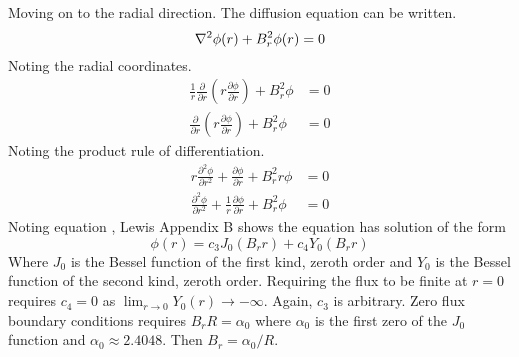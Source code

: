   Moving on to the radial direction. The diffusion equation can be written.
  \begin{equation}
    \mathbf{\nabla}^2 \phi(r) + B_r^2 \phi(r) = 0
  \end{equation}
  Noting the radial coordinates.
  \begin{align}
    \frac{1}{r} \frac{\partial}{\partial r} \left( r \frac{\partial \phi}
      {\partial r} \right) + B_r^2 \phi &= 0 \\
    \frac{\partial}{\partial r} \left( r \frac{\partial \phi}{\partial r}
      \right) + B_r^2 \phi &= 0
  \end{align}
  Noting the product rule of differentiation.
  \begin{align}
    r \frac{\partial^2 \phi}{\partial r^2} + \frac{\partial \phi}
      {\partial r} + B_r^2 r \phi &= 0 \\
    \frac{\partial^2 \phi}{\partial r^2} + \frac{1}{r} \frac{\partial \phi}
      {\partial r} + B_r^2 \phi &= 0 \label{eq:besselequation}
  \end{align}
  Noting equation , Lewis Appendix B shows the 
  equation has solution of the form
  \begin{equation} \label{eq:cyl_radial}
    \phi(r) = c_3 J_0(B_r r) + c_4 Y_0(B_r r)
  \end{equation}
  Where $J_0$ is the Bessel function of the first kind, zeroth order and $Y_0$
  is the Bessel function of the second kind, zeroth order. Requiring the flux
  to be finite at $r=0$ requires $c_4=0$ as 
  $\lim_{r\rightarrow0} Y_0(r) \rightarrow -\infty$. Again, $c_3$ is arbitrary. 
  Zero flux boundary conditions requires $B_r R=\alpha_0$ where $\alpha_0$ is 
  the first zero of the $J_0$ function and $\alpha_0 \approx 2.4048$. Then 
  $B_r=\alpha_0/R$.
  
